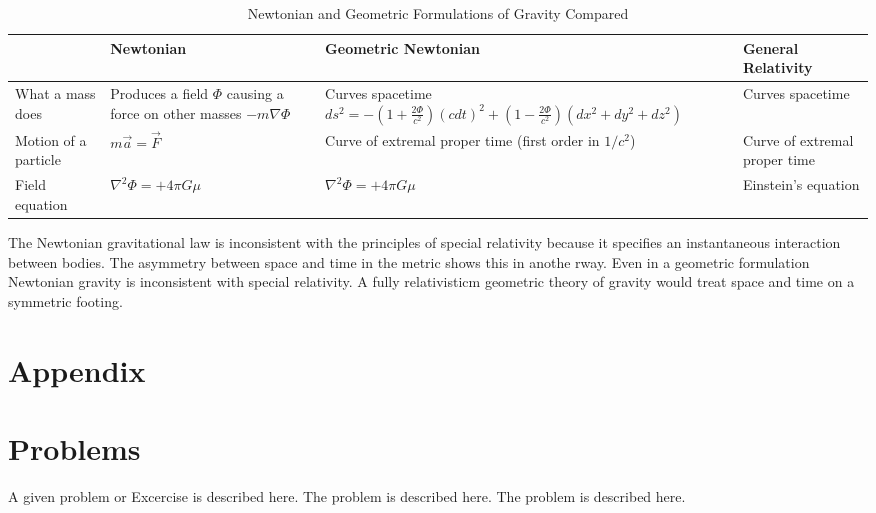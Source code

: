 \begin{table}[H]
    \centering
    \caption{Newtonian and Geometric Formulations of Gravity Compared}
    \begin{tabular}{p{4cm}p{5cm}p{5cm}p{4cm}}
        \hline
        & Newtonian & Geometric Newtonian & General Relativity \\ \hline
        What a mass does & Produces a field $\Phi$ causing a force on other masses $-m\nabla \Phi$ & Curves spacetime $ds^2 = -\left(1+\frac{2\Phi}{c^2}\right)(cdt)^2 + \left(1-\frac{2\Phi}{c^2}\right)(dx^2+dy^2+dz^2)$ & Curves spacetime \\
        Motion of a particle & $m\vec{a} = \vec{F}$ & Curve of extremal proper time (first order in $1/c^2$) & Curve of extremal proper time \\ 
        Field equation & $\nabla^2\Phi = +4\pi G\mu$ & $\nabla^2\Phi = +4\pi G\mu$ & Einstein's equation \\ \hline 
    \end{tabular}
    \label{tab:newtGeom}
\end{table}

The Newtonian gravitational law is inconsistent with the principles of special relativity because it specifies an instantaneous interaction between bodies. The asymmetry between space and time in the metric shows this in anothe rway. Even in a geometric formulation Newtonian gravity is inconsistent with special relativity. A fully relativisticm geometric theory of gravity would treat space and time on a symmetric footing.








%
\section*{Appendix}




\section*{Problems}
%
\begin{prob}
\label{prob1}
A given problem or Excercise is described here. The
problem is described here. The problem is described here.
\end{prob}



